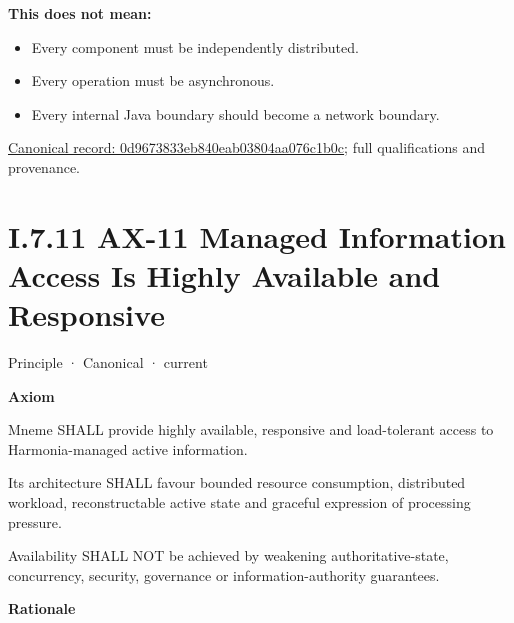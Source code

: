 \textbf{This does not mean:}



\begin{itemize}


\item Every component must be independently distributed.

\item Every operation must be asynchronous.

\item Every internal Java boundary should become a network boundary.

\end{itemize}

{\footnotesize \href{../../../../../../../../continuum/motivation/principle/0d9673833eb840eab03804aa076c1b0c.md}{Canonical record: 0d9673833eb840eab03804aa076c1b0c}; full qualifications and provenance.}\par
\section*{I.7.11 AX-11 Managed Information Access Is Highly Available and Responsive}
\label{navigation:I.7.11}

\label{element:8a1e995f16954484a78ae1c5c114d546}
{\small Principle · Canonical · current}\par

\par\medskip\textbf{Axiom}\par


Mneme SHALL provide highly available, responsive and load-tolerant
access to Harmonia-managed active information.



Its architecture SHALL favour bounded resource consumption, distributed
workload, reconstructable active state and graceful expression of
processing pressure.



Availability SHALL NOT be achieved by weakening authoritative-state,
concurrency, security, governance or information-authority guarantees.



\par\medskip\textbf{Rationale}\par


